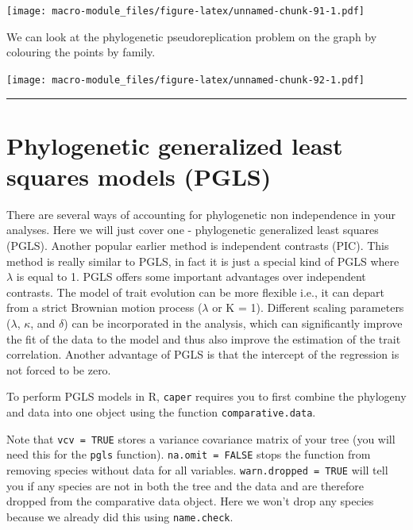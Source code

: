 \documentclass[]{book}
\newenvironment{Shaded}{\begin{snugshade}}{\end{snugshade}}
\newcommand{\KeywordTok}[1]{\textcolor[rgb]{0.13,0.29,0.53}{\textbf{{#1}}}}
\newcommand{\DataTypeTok}[1]{\textcolor[rgb]{0.13,0.29,0.53}{{#1}}}
\newcommand{\DecValTok}[1]{\textcolor[rgb]{0.00,0.00,0.81}{{#1}}}
\newcommand{\StringTok}[1]{\textcolor[rgb]{0.31,0.60,0.02}{{#1}}}
\newcommand{\NormalTok}[1]{{#1}}
\theoremstyle{definition}
\theoremstyle{definition}
\theoremstyle{definition}
\theoremstyle{remark}
\begin{document}
\texttt{[image: macro-module\_files/figure-latex/unnamed-chunk-91-1.pdf]}

We can look at the phylogenetic pseudoreplication problem on the graph
by colouring the points by family.

\begin{Shaded}
\end{Shaded}

\texttt{[image: macro-module\_files/figure-latex/unnamed-chunk-92-1.pdf]}

\begin{center}\rule{0.5\linewidth}{\linethickness}\end{center}

\section{Phylogenetic generalized least squares models
(PGLS)}\label{phylogenetic-generalized-least-squares-models-pgls}

There are several ways of accounting for phylogenetic non independence
in your analyses. Here we will just cover one - phylogenetic generalized
least squares (PGLS). Another popular earlier method is independent
contrasts (PIC). This method is really similar to PGLS, in fact it is
just a special kind of PGLS where \(\lambda\) is equal to 1. PGLS offers
some important advantages over independent contrasts. The model of trait
evolution can be more flexible i.e., it can depart from a strict
Brownian motion process (\(\lambda\) or K = 1). Different scaling
parameters (\(\lambda\), \(\kappa\), and \(\delta\)) can be incorporated
in the analysis, which can significantly improve the fit of the data to
the model and thus also improve the estimation of the trait correlation.
Another advantage of PGLS is that the intercept of the regression is not
forced to be zero.

To perform PGLS models in R, \texttt{caper} requires you to first
combine the phylogeny and data into one object using the function
\texttt{comparative.data}.

Note that \texttt{vcv\ =\ TRUE} stores a variance covariance matrix of
your tree (you will need this for the \texttt{pgls} function).
\texttt{na.omit\ =\ FALSE} stops the function from removing species
without data for all variables. \texttt{warn.dropped\ =\ TRUE} will tell
you if any species are not in both the tree and the data and are
therefore dropped from the comparative data object. Here we won't drop
any species because we already did this using \texttt{name.check}.
\end{document}
